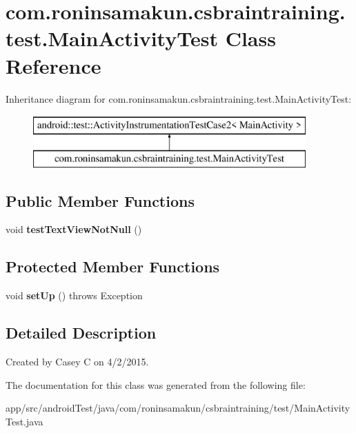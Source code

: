 \section{com.\+roninsamakun.\+csbraintraining.\+test.\+Main\+Activity\+Test Class Reference}
\label{classcom_1_1roninsamakun_1_1csbraintraining_1_1test_1_1_main_activity_test}
Inheritance diagram for com.\+roninsamakun.\+csbraintraining.\+test.\+Main\+Activity\+Test\+:\begin{figure}[H]
\begin{center}
\leavevmode
\includegraphics[height=2.000000cm]{classcom_1_1roninsamakun_1_1csbraintraining_1_1test_1_1_main_activity_test}
\end{center}
\end{figure}
\subsection*{Public Member Functions}
\begin{DoxyCompactItemize}
\item 
void {\bfseries test\+Text\+View\+Not\+Null} ()\label{classcom_1_1roninsamakun_1_1csbraintraining_1_1test_1_1_main_activity_test_acafeb2fdd136e3f49cbb7d8ededb486e}

\end{DoxyCompactItemize}
\subsection*{Protected Member Functions}
\begin{DoxyCompactItemize}
\item 
void {\bfseries set\+Up} ()  throws Exception \label{classcom_1_1roninsamakun_1_1csbraintraining_1_1test_1_1_main_activity_test_a14bd74f0ec65b3ddae52210a0423b460}

\end{DoxyCompactItemize}


\subsection{Detailed Description}
Created by Casey C on 4/2/2015. 

The documentation for this class was generated from the following file\+:\begin{DoxyCompactItemize}
\item 
app/src/android\+Test/java/com/roninsamakun/csbraintraining/test/Main\+Activity\+Test.\+java\end{DoxyCompactItemize}
